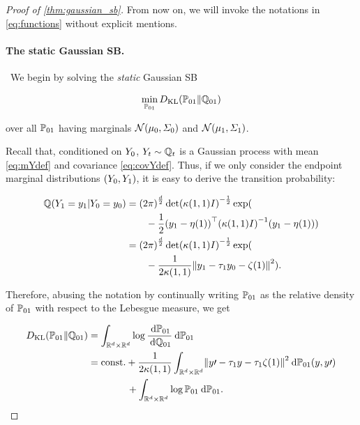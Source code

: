 \begin{proof}[Proof of \cref{thm:gaussian_sb}]
From now on, we will invoke the notations in \eqref{eq:functions} without explicit mentions.

\paragraph{The static Gaussian SB.}
~We begin by solving the \emph{static} Gaussian \acrshort{SB}

\begin{align}
\label{eq:staticGSB}
\min_{ \Psta}\KL(\Psta \| \Qsta)
\end{align}

over all $\Psta$ having marginals $\Ncal\parens*{  \m, \covar }$ and $\Ncal\parens*{  \malt, \covaralt }$.

Recall that, conditioned on $\refsde[0]$, $\refsde \sim \refpro$ is a Gaussian process with mean \eqref{eq:mYdef} and covariance \eqref{eq:covYdef}. Thus, if we only consider the endpoint marginal distributions $(\refsde[0], \refsde[\horizon])$, it is easy to derive the transition probability:

\begin{align}
\refprobase\parens*{   \refsde[\horizon] = y_\horizon \middle| \refsde[0] = y_0 } &= \Nconst  \det \parens*{\kernel[\horizon][\horizon] \eye }^{-\frac{1}{2}} \exp(  \\
\nn & \qquad-\frac{1}{2}  \parens*{y_\horizon - \mYcinit[\horizon]}^\top  \parens*{\kernel[\horizon][\horizon] \eye }^{-1}\parens*{y_\horizon - \mYcinit[\horizon]} ) \\
&= \Nconst  \det \parens*{\kernel[\horizon][\horizon] \eye }^{-\frac{1}{2}} \exp( \\ 
\nn & \qquad-\frac{1}{2\kernel[\horizon][\horizon]}  \norm*{  y_\horizon - \aggtime[\horizon] y_0  - \tshift[\horizon]   }^2).
\end{align}

Therefore, abusing the notation by continually writing $\Psta$ as the relative density of $\Psta$ with respect to the Lebesgue measure, we get

\begin{align}
\label{eq:KLsta}
\KL(\Psta \| \Qsta) &= \int_{\R^\vdim \times \R^\vdim}  \log \frac{\dd \Psta } {\dd \Qsta} \dd \Psta \\
\label{eq:hold}
&=   \const +  \frac{1}{2 \kernel[\horizon][\horizon]} \int_{\R^\vdim \times \R^\vdim}  \norm*{  y\prime - \aggtime[\horizon] y   - \aggtime[\horizon]\tshift[\horizon]    }^2  \dd \Psta(y,y\prime) \\
\nn &\qquad\qquad+  \intRR \log  \Psta  \dd \Psta.
\end{align}


\end{proof}
